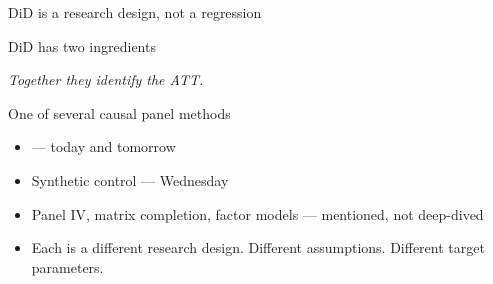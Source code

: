 \documentclass[aspectratio=169,11pt]{beamer}
\begin{document}

\begin{frame}{DiD is a research design, not a regression}
\vspace{1.2em}
\end{frame}

\begin{frame}{DiD has two ingredients}
\vspace{0.4em}
\begin{center}
\end{center}
\vspace{0.8em}
\begin{center}
\small\color{warmgray}\itshape Together they identify the ATT.
\end{center}
\end{frame}

\begin{frame}{One of several causal panel methods}
\vspace{0.5em}
\begin{itemize}
  \item {} --- today and tomorrow
  \item Synthetic control --- Wednesday
  \item Panel IV, matrix completion, factor models --- mentioned, not deep-dived
  \item Each is a different research design. Different assumptions. Different target parameters.
\end{itemize}
\end{frame}
\end{document}
